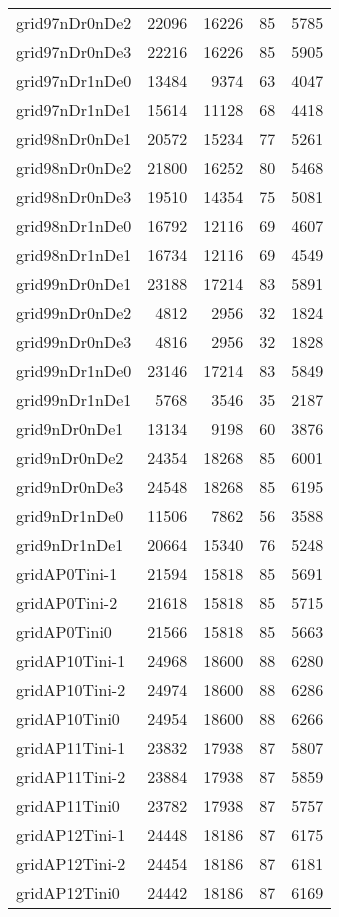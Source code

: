 \begin{longtable}{lrrrr}
grid97nDr0nDe2 & 22096 & 16226 & 85 & 5785 \\
grid97nDr0nDe3 & 22216 & 16226 & 85 & 5905 \\
grid97nDr1nDe0 & 13484 & 9374 & 63 & 4047 \\
grid97nDr1nDe1 & 15614 & 11128 & 68 & 4418 \\
grid98nDr0nDe1 & 20572 & 15234 & 77 & 5261 \\
grid98nDr0nDe2 & 21800 & 16252 & 80 & 5468 \\
grid98nDr0nDe3 & 19510 & 14354 & 75 & 5081 \\
grid98nDr1nDe0 & 16792 & 12116 & 69 & 4607 \\
grid98nDr1nDe1 & 16734 & 12116 & 69 & 4549 \\
grid99nDr0nDe1 & 23188 & 17214 & 83 & 5891 \\
grid99nDr0nDe2 & 4812 & 2956 & 32 & 1824 \\
grid99nDr0nDe3 & 4816 & 2956 & 32 & 1828 \\
grid99nDr1nDe0 & 23146 & 17214 & 83 & 5849 \\
grid99nDr1nDe1 & 5768 & 3546 & 35 & 2187 \\
grid9nDr0nDe1 & 13134 & 9198 & 60 & 3876 \\
grid9nDr0nDe2 & 24354 & 18268 & 85 & 6001 \\
grid9nDr0nDe3 & 24548 & 18268 & 85 & 6195 \\
grid9nDr1nDe0 & 11506 & 7862 & 56 & 3588 \\
grid9nDr1nDe1 & 20664 & 15340 & 76 & 5248 \\
gridAP0Tini-1 & 21594 & 15818 & 85 & 5691 \\
gridAP0Tini-2 & 21618 & 15818 & 85 & 5715 \\
gridAP0Tini0 & 21566 & 15818 & 85 & 5663 \\
gridAP10Tini-1 & 24968 & 18600 & 88 & 6280 \\
gridAP10Tini-2 & 24974 & 18600 & 88 & 6286 \\
gridAP10Tini0 & 24954 & 18600 & 88 & 6266 \\
gridAP11Tini-1 & 23832 & 17938 & 87 & 5807 \\
gridAP11Tini-2 & 23884 & 17938 & 87 & 5859 \\
gridAP11Tini0 & 23782 & 17938 & 87 & 5757 \\
gridAP12Tini-1 & 24448 & 18186 & 87 & 6175 \\
gridAP12Tini-2 & 24454 & 18186 & 87 & 6181 \\
gridAP12Tini0 & 24442 & 18186 & 87 & 6169 \\

\end{longtable}
